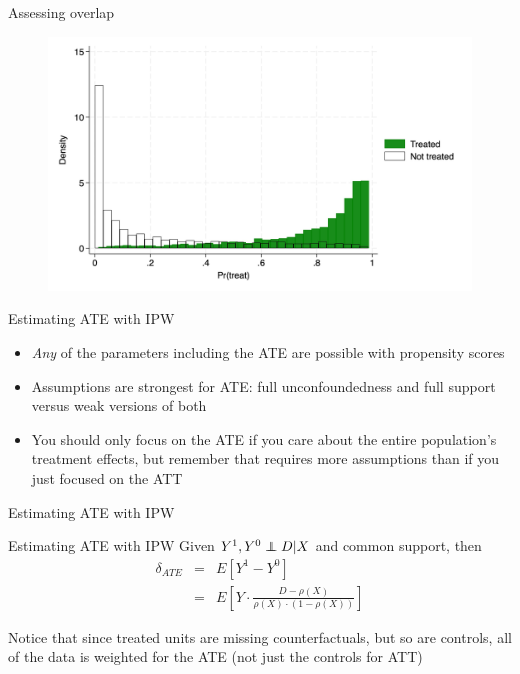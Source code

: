 \documentclass{beamer}
\newcommand\independent{\protect\mathpalette{\protect\independenT}{\perp}}
\def\independenT#1#2{\mathrel{\rlap{$#1#2$}\mkern2mu{#1#2}}}
\begin{document}
\begin{frame}{Assessing overlap}

\begin{figure}[!t]\centering
\includegraphics[scale=0.12]{./lecture_includes/pscore_overlap}
\end{figure}

\end{frame}

\begin{frame}{Estimating ATE with IPW}

\begin{itemize}
\item \emph{Any} of the parameters including the ATE are possible with propensity scores

\item Assumptions are strongest for ATE:  full unconfoundedness and full support versus weak versions of both 

\item You should only focus on the ATE if you care about the entire population's treatment effects, but remember that requires more assumptions than if you just focused on the ATT

\end{itemize}

\end{frame}

	


\begin{frame}{Estimating ATE with IPW}

	
		\begin{block}{Estimating ATE with IPW}
	Given $Y^1,Y^0 \independent{D}|X$ and common support, then
		\begin{eqnarray*}
		\delta_{ATE}&=&E[Y^1-Y^0] \\
		&=&E \left[ Y \cdot  \frac{D - \rho(X)}{\rho(X) \cdot (1-\rho(X))} \right]
		\end{eqnarray*}
	\end{block}

Notice that since treated units are missing counterfactuals, but so are controls, all of the data is weighted for the ATE (not just the controls for ATT)

\end{frame}
\end{document}
